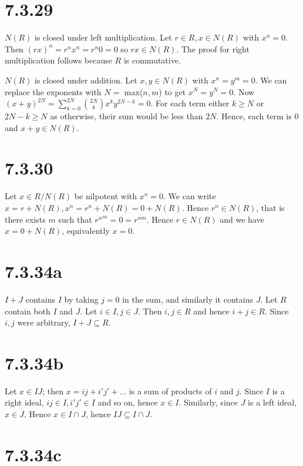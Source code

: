 \documentclass{article}
\begin{document}
\section*{7.3.29}

$N(R)$ is closed under left multiplication. Let $r \in R, x \in N(R)$ with $x^n = 0$. Then $(rx)^n = r^n x^n = r^n 0 = 0$ so $rx \in N(R)$. The proof for right multiplication follows because $R$ is commutative.

$N(R)$ is closed under addition. Let $x, y \in N(R)$ with $x^n = y^m = 0$. We can replace the exponents with $N = $ max($n, m$) to get $x^N = y^N = 0$. Now $(x + y)^{2N} = \sum_{k=0}^{2N} {2N \choose k} x^k y^{2N-k} = 0$. For each term either $k \ge N$ or $2N - k \ge N$ as otherwise, their sum would be less than $2N$. Hence, each term is 0 and $x + y \in N(R)$.

\section*{7.3.30}

Let $x \in R/N(R)$ be nilpotent with $x^n = 0$. We can write $x = r + N(R), x^n = r^n + N(R) = 0 + N(R)$. Hence $r^n \in N(R)$, that is there exists $m$ such that ${r^n}^m = 0 = r^{nm}$. Hence $r \in N(R)$ and we have $x = 0 + N(R)$, equivalently $x = 0$.

\section*{7.3.34a}

$I + J$ contains $I$ by taking $j = 0$ in the sum, and similarly it contains $J$. Let $R$ contain both $I$ and $J$. Let $i \in I, j \in J$. Then $i, j \in R$ and hence $i + j \in R$. Since $i, j$ were arbitrary, $I + J \subseteq R$.

\section*{7.3.34b}

Let $x \in IJ$; then $x = ij + i'j' + \ldots$ is a sum of products of $i$ and $j$. Since $I$ is a right ideal, $ij \in I, i'j' \in I$ and so on, hence $x \in I$. Similarly, since $J$ is a left ideal, $x \in J$. Hence $x \in I \cap J$, hence $IJ \subseteq I \cap J$.

\section*{7.3.34c}
\end{document}
